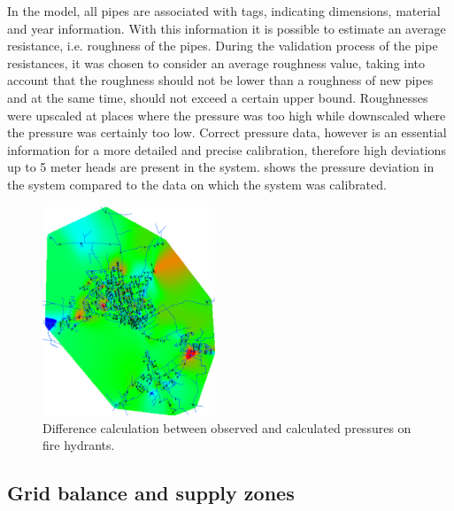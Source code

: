In the model, all pipes are associated with tags, indicating dimensions, material and year information. With this information it is possible to estimate an average resistance, i.e. roughness of the pipes. 
During the validation process of the pipe resistances, it was chosen to consider an average roughness value, taking into account that the roughness should not be lower than a roughness of new pipes and at the same time, should not exceed a certain upper bound. Roughnesses were upscaled at places where the pressure was too high while downscaled where the pressure was certainly too low. Correct pressure data, however is an essential information for a more detailed and precise calibration, therefore high deviations up to 5 meter heads are present in the system.  shows the pressure deviation in the system compared to the data on which the system was calibrated. 
\vspace{-4mm}
\begin{figure}[H]
\centering
\includegraphics[width=0.46\textwidth]{report/pictures/fire_hydrants}
% 
\caption{Difference calculation between observed and calculated pressures on fire hydrants\cite{verdo_doc}.}
\label{fig:pressure_mistakes}
\end{figure}
\vspace{-8mm}

\subsection{Grid balance and supply zones}
\label{grid_balance_supply_zones}

